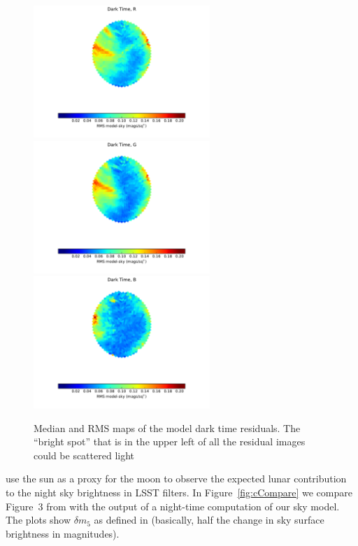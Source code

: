 \documentclass[]{spie}
\begin{document}
\begin{figure}
  \includegraphics[height=5cm]{plots/stdResidMap_R.pdf}\includegraphics[height=5cm]{plots/stdResidMap_g.pdf}\includegraphics[height=5cm]{plots/stdResidMap_b.pdf}
  \caption{Median and RMS maps of the model dark time residuals. The ``bright spot'' that is in the upper left of all the residual images could be scattered light }
\end{figure}


\cite{Coughlin15} use the sun as a proxy for the moon to observe the expected lunar contribution to the night sky brightness in LSST filters. In Figure~\ref{fig:cCompare} we compare Figure~3 from \cite{Coughlin15} with the output of a night-time computation of our sky model.  The plots show $\delta m_5$ as defined in \cite{Coughlin15} (basically, half the change in sky surface brightness in magnitudes).  
\end{document}
